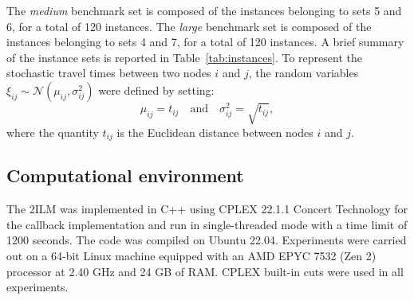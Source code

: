 \documentclass[11pt]{article}
\theoremstyle{definition}
\begin{document}
%
The \emph{medium} benchmark set is composed of the instances belonging to sets 5 and 6, for a total of 120 instances.
%
The \emph{large} benchmark set is composed of the instances belonging to sets 4 and 7, for a total of 120 instances.
%
A brief summary of the instance sets is reported in Table~\ref{tab:instances}.
%
%
To represent the stochastic travel times between two nodes $i$ and $j$, the random variables $\xi_{ij} \sim \mathcal{N}(\mu_{ij}, \sigma_{ij}^2)$ were defined by setting:
%
\[\mu_{ij} = t_{ij} \quad \text{and} \quad \sigma_{ij}^2 = \sqrt{t_{ij}},\]
%
where the quantity $t_{ij}$ is the Euclidean distance between nodes $i$ and $j$.

\subsection{Computational environment}
\label{ssec:environment}

The 2ILM was implemented in C++ using CPLEX 22.1.1 Concert Technology for the callback implementation and run in single-threaded mode with a time limit of 1200 seconds. The code was compiled on Ubuntu 22.04. Experiments were carried out on a 64-bit Linux machine equipped with an AMD EPYC 7532 (Zen 2) processor at 2.40 GHz and 24 GB of RAM. CPLEX built-in cuts were used in all experiments. %


\end{document}

